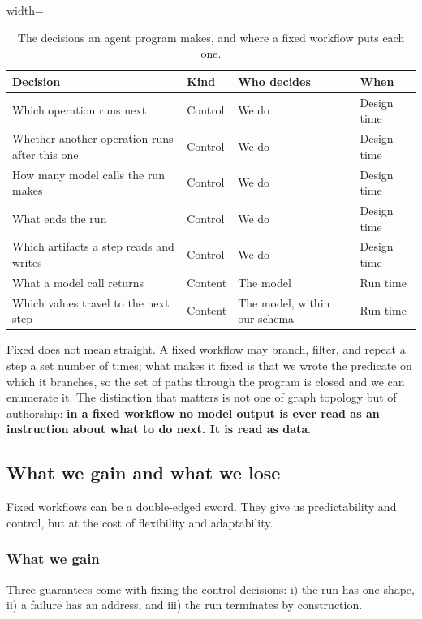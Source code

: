 \begin{table}[tbp]
  \caption{The decisions an agent program makes, and where a fixed workflow puts each one.}
  \label{tab:fixed-decisions}
  \begin{adjustbox}{width=\linewidth}\begin{tabularx}{\linewidth}{XXXX}
    \toprule
    Decision & Kind & Who decides & When \\
    \midrule
    Which operation runs next & Control & We do & Design time \\
    Whether another operation runs after this one & Control & We do & Design time \\
    How many model calls the run makes & Control & We do & Design time \\
    What ends the run & Control & We do & Design time \\
    Which artifacts a step reads and writes & Control & We do & Design time \\
    \midrule
    What a model call returns & Content & The model & Run time \\
    Which values travel to the next step & Content & The model, within our schema & Run time \\
    \bottomrule
  \end{tabularx}\end{adjustbox}
\end{table}

Fixed does not mean straight. A fixed workflow may branch, filter, and repeat a step a set
number of times; what makes it fixed is that we wrote the predicate on which it branches, so the
set of paths through the program is closed and we can enumerate it. The distinction that matters
is not one of graph topology but of authorship: \textbf{in a fixed workflow no model output is ever read
as an instruction about what to do next. It is read as data}.

\subsection{What we gain and what we lose}
\label{sec:fixed-tradeoff}

Fixed workflows can be a double-edged sword. They give us predictability and control, but at the cost of flexibility and adaptability.

\subsubsection{What we gain}
Three guarantees come with fixing the control decisions: i) the run has one shape, ii) a failure
has an address, and iii) the run terminates by construction. 
\bi

